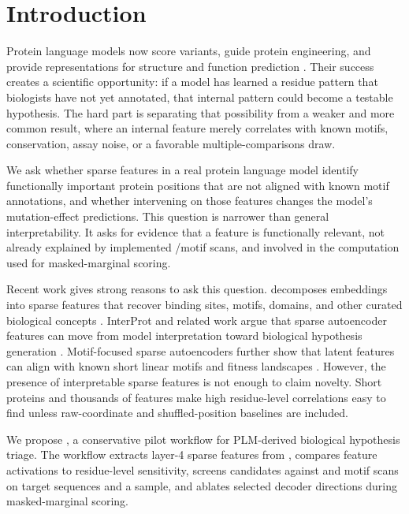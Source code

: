 \section{Introduction}
\label{sec:introduction}

Protein language models now score variants, guide protein engineering, and provide representations for structure and function prediction \cite{rives2021biological,lin2023evolutionary,notin2023proteingym}. Their success creates a scientific opportunity: if a model has learned a residue pattern that biologists have not yet annotated, that internal pattern could become a testable hypothesis. The hard part is separating that possibility from a weaker and more common result, where an internal feature merely correlates with known motifs, conservation, assay noise, or a favorable multiple-comparisons draw.

 We ask whether sparse features in a real protein language model identify functionally important protein positions that are not aligned with known motif annotations, and whether intervening on those features changes the model's mutation-effect predictions. This question is narrower than general interpretability. It asks for evidence that a feature is functionally relevant, not already explained by implemented \elm/\prosite motif scans, and involved in the computation used for masked-marginal scoring.

Recent work gives strong reasons to ask this question. \interplm decomposes \esm embeddings into sparse features that recover binding sites, motifs, domains, and other curated biological concepts \cite{simon2025interplm}. InterProt and related work argue that sparse autoencoder features can move from model interpretation toward biological hypothesis generation \cite{adams2025mechanistic}. Motif-focused sparse autoencoders further show that latent features can align with known short linear motifs and fitness landscapes \cite{hou2025motifae}. However, the presence of interpretable sparse features is not enough to claim novelty. Short proteins and thousands of features make high residue-level correlations easy to find unless raw-coordinate and shuffled-position baselines are included.

We propose \methodname, a conservative pilot workflow for PLM-derived biological hypothesis triage. The workflow extracts \interplm layer-4 sparse features from \esmeight, compares feature activations to \proteingym residue-level \dms sensitivity, screens candidates against \elm and \prosite motif scans on target sequences and a \swissprot sample, and ablates selected decoder directions during \esm masked-marginal scoring.

